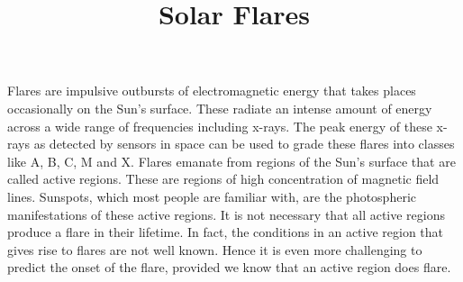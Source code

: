 \documentclass{../template/texnote}
\title{Solar Flares}
\begin{document}
    \maketitle {}
Flares are impulsive outbursts of electromagnetic energy that takes places occasionally on the Sun's surface. 
These radiate an intense amount of energy across a wide range of frequencies including x-rays. The peak energy of these x-rays as detected by sensors in space can be used to grade these flares into classes like A, B, C, M and X.
Flares emanate from regions of the Sun's surface that are called active regions. These are regions of high concentration of magnetic field lines.
Sunspots, which most people are familiar with, are the photospheric manifestations of these active regions.
It is not necessary that all active regions produce a flare in their lifetime.
In fact, the conditions in an active region that gives rise to flares are not well known. 
Hence it is even more challenging to predict the onset of the flare, provided we know that an active region does flare.
    \printbibliography
\end{document}
